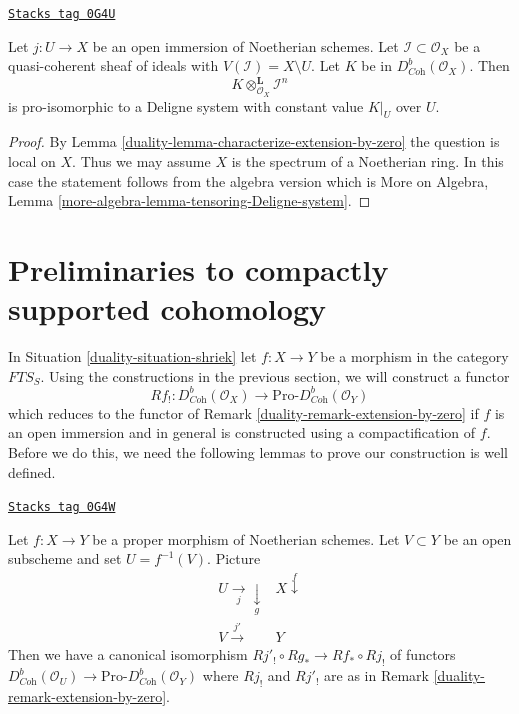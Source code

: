 \begin{lemma}
\label{duality-lemma-tensoring-Deligne-system}
\href{https://stacks.math.columbia.edu/tag/0G4U}{\texttt{Stacks tag 0G4U}}

Let $j : U \to X$ be an open immersion of Noetherian schemes. Let
$\mathcal{I} \subset \mathcal{O}_X$ be a quasi-coherent sheaf of
ideals with $V(\mathcal{I}) = X \setminus U$.
Let $K$ be in $D^b_{\textit{Coh}}(\mathcal{O}_X)$.
Then
$$
K \otimes_{\mathcal{O}_X}^\mathbf{L} \mathcal{I}^n
$$
is pro-isomorphic to a Deligne system with constant value $K|_U$ over $U$.
\end{lemma}

\begin{proof}

By Lemma \ref{duality-lemma-characterize-extension-by-zero} the question is
local on $X$. Thus we may assume $X$ is the spectrum of a Noetherian
ring. In this case the statement follows from the algebra version which is
More on Algebra, Lemma \ref{more-algebra-lemma-tensoring-Deligne-system}.
\end{proof}

\section{Preliminaries to compactly supported cohomology}
\label{duality-section-preliminaries-compactly-supported}
In Situation \ref{duality-situation-shriek} let $f : X \to Y$ be a morphism
in the category $\textit{FTS}_S$. Using the constructions in the
previous section, we will construct a functor
$$
Rf_! :
D^b_{\textit{Coh}}(\mathcal{O}_X)
\longrightarrow
\text{Pro-}D^b_{\textit{Coh}}(\mathcal{O}_Y)
$$
which reduces to the functor of Remark \ref{duality-remark-extension-by-zero}
if $f$ is an open immersion and in general is constructed using a
compactification of $f$. Before we do this, we need the following lemmas
to prove our construction is well defined.

\begin{lemma}
\label{duality-lemma-well-defined-pre}
\href{https://stacks.math.columbia.edu/tag/0G4W}{\texttt{Stacks tag 0G4W}}

Let $f : X \to Y$ be a proper morphism of Noetherian schemes.
Let $V \subset Y$ be an open subscheme and set $U = f^{-1}(V)$.
Picture
$$
\begin{array}{cc}U \underset{j}{\longrightarrow}\underset{g}{\downarrow} & X \overset{f}{\downarrow} \\ V \overset{j'}{\longrightarrow} & Y\end{array}
$$
Then we have a canonical isomorphism $Rj'_! \circ Rg_* \to Rf_* \circ Rj_!$
of functors $D^b_{\textit{Coh}}(\mathcal{O}_U) \to
\text{Pro-}D^b_{\textit{Coh}}(\mathcal{O}_Y)$ where
$Rj_!$ and $Rj'_!$ are as in Remark \ref{duality-remark-extension-by-zero}.
\end{lemma}

